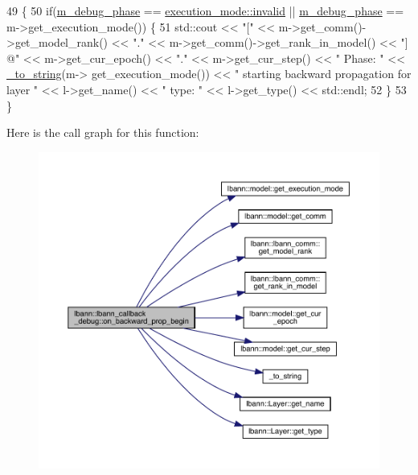 \begin{DoxyCode}
49                                                                          \{
50   \textcolor{keywordflow}{if}(\hyperlink{classlbann_1_1lbann__callback__debug_acc66ab699534e42aa958148f1fb3fd6f}{m\_debug\_phase} == \hyperlink{base_8hpp_a2781a159088df64ed7d47cc91c4dc0a8afedb2d84cafe20862cb4399751a8a7e3}{execution\_mode::invalid} || 
      \hyperlink{classlbann_1_1lbann__callback__debug_acc66ab699534e42aa958148f1fb3fd6f}{m\_debug\_phase} == m->get\_execution\_mode()) \{
51     std::cout << \textcolor{stringliteral}{"["} << m->get\_comm()->get\_model\_rank() << \textcolor{stringliteral}{"."} << m->get\_comm()->get\_rank\_in\_model() << \textcolor{stringliteral}{"]
       @"} << m->get\_cur\_epoch() << \textcolor{stringliteral}{"."} << m->get\_cur\_step() << \textcolor{stringliteral}{" Phase: "} << \hyperlink{base_8hpp_adeeaddd10bd31df0cae7cb0fcae45d5c}{\_to\_string}(m->
      get\_execution\_mode()) << \textcolor{stringliteral}{" starting backward propagation for layer "} << l->get\_name() << \textcolor{stringliteral}{" type: "} << l->get\_type() << 
      std::endl;
52   \}
53 \}
\end{DoxyCode}
Here is the call graph for this function\+:\nopagebreak
\begin{figure}[H]
\begin{center}
\leavevmode
\includegraphics[width=350pt]{classlbann_1_1lbann__callback__debug_adaf60c995d2638a40d9c87a923c53865_cgraph}
\end{center}
\end{figure}
